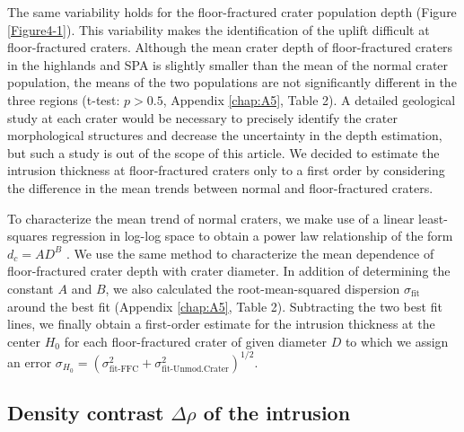 The same  variability holds for the  floor-fractured crater population
depth   (Figure   \ref{Figure4-1}).    This  variability   makes   the
identification   of   the    uplift   difficult   at   floor-fractured
craters. Although the mean crater  depth of floor-fractured craters in
the highlands and SPA is slightly  smaller than the mean of the normal
crater  population,  the   means  of  the  two   populations  are  not
significantly  different  in  the  three regions  (t-test:  $p>  0.5$,
Appendix \ref{chap:A5}, Table 2).  A detailed geological study at each
crater   would  be   necessary  to   precisely  identify   the  crater
morphological  structures and  decrease the  uncertainty in  the depth
estimation, but such a study is out  of the scope of this article.  We
decided to estimate the intrusion thickness at floor-fractured craters
only to a first order by considering the difference in the mean trends
between normal and floor-fractured craters.

To characterize  the mean trend  of normal craters,  we make use  of a
linear least-squares regression in log-log space to obtain a power law
relationship of the form $d_c=AD^B$ \citep{Pike:1974ux,Kalynn:2013fg}.
We  use  the  same  method  to characterize  the  mean  dependence  of
floor-fractured  crater depth  with crater  diameter.  In  addition of
determining  the  constant  $A$  and   $B$,  we  also  calculated  the
root-mean-squared dispersion $\sigma_{\text{fit}}$ around the best fit
(Appendix  \ref{chap:A5},  Table 2).   Subtracting  the  two best  fit
lines,  we finally  obtain a  first-order estimate  for the  intrusion
thickness at the center $H_0$ for each floor-fractured crater of given
diameter     $D$      to     which     we     assign      an     error
$\sigma_{H_0}
=(\sigma_{\text{fit-FFC}}^2+\sigma_{\text{fit-Unmod.Crater}}^2)^{1/2}$.

\subsection{Density contrast $\Delta \rho$ of the intrusion}
\label{sec:intr-dens-contr}

